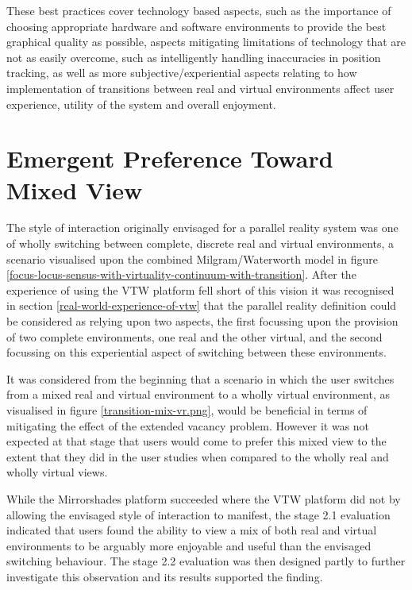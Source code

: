 These best practices cover technology based aspects, such as the importance of choosing appropriate hardware and software environments to provide the best graphical quality as possible, aspects mitigating limitations of technology that are not as easily overcome, such as intelligently handling inaccuracies in position tracking, as well as more subjective/experiential aspects relating to how implementation of transitions between real and virtual environments affect user experience, utility of the system and overall enjoyment.


\section{Emergent Preference Toward Mixed View}

The style of interaction originally envisaged for a parallel reality system was one of wholly switching between complete, discrete real and virtual environments, a scenario visualised upon the combined Milgram/Waterworth model in figure \ref{focus-locus-sensus-with-virtuality-continuum-with-transition}. After the experience of using the VTW platform fell short of this vision it was recognised in section \ref{real-world-experience-of-vtw} that the parallel reality definition could be considered as relying upon two aspects, the first focussing upon the provision of two complete environments, one real and the other virtual, and the second focussing on this experiential aspect of switching between these environments.

It was considered from the beginning that a scenario in which the user switches from a mixed real and virtual environment to a wholly virtual environment, as visualised in figure \ref{transition-mix-vr.png}, would be beneficial in terms of mitigating the effect of the extended vacancy problem. However it was not expected at that stage that users would come to prefer this mixed view to the extent that they did in the user studies when compared to the wholly real and wholly virtual views.

While the Mirrorshades platform succeeded where the VTW platform did not by allowing the envisaged style of interaction to manifest, the stage 2.1 evaluation indicated that users found the ability to view a mix of both real and virtual environments to be arguably more enjoyable and useful than the envisaged switching behaviour. The stage 2.2 evaluation was then designed partly to further investigate this observation and its results supported the finding.

